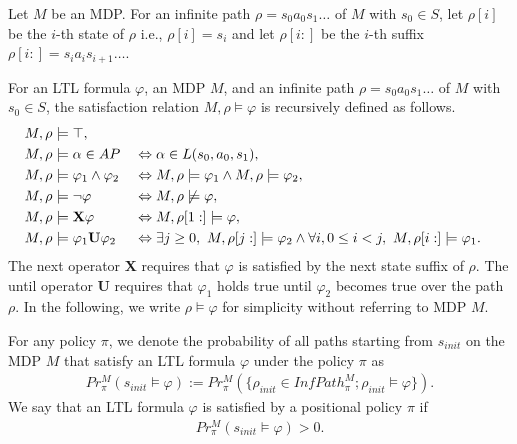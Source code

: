 \documentclass[a4j,12pt,oneside,openany,english]{jsbook}
\begin{document}
Let $ M $ be an MDP.
For an infinite path $\rho = s_0a_0s_1 \ldots $ of $ M $ with $ s_0 \in S $, let $\rho[i]$ be the $i$-th state of $\rho$ i.e., $\rho[i]=s_i$ and let $\rho[i:]$ be the $i$-th suffix $\rho[i:]=s_ia_is_{i+1} \ldots $.
\begin{definition}
	For an LTL formula $\varphi$, an MDP $M$, and an infinite path $\rho = s_0a_0s_1 \ldots$ of $ M $ with $ s_0 \in S $, the satisfaction relation $M,\rho \models \varphi$ is recursively defined as follows.
	\begin{alignat}{2}
	& M, \rho \models \top,\nonumber \\
	& M, \rho \models \alpha \in AP &&\Leftrightarrow \alpha \in L(s_0,a_0,s_1),\nonumber \\
	& M, \rho \models \varphi_1 \land \varphi_2 &&\Leftrightarrow M, \rho \models \varphi_1 \land M, \rho \models \varphi_2,\nonumber \\
	& M, \rho \models \neg \varphi &&\Leftrightarrow M, \rho \not\models \varphi,\nonumber \\
	& M, \rho \models \text{{\bf X}}\varphi &&\Leftrightarrow M, \rho[1:] \models \varphi,\nonumber \\
	& M, \rho \models \varphi_1 \text{{\bf U}} \varphi_2 &&\Leftrightarrow \exists j \geq 0, \ M, \rho[j:] \models \varphi_2 \land \forall i, 0\leq i < j, \ M, \rho[i:] \models \varphi_1.\nonumber
	\end{alignat}
The next operator {\bf X} requires that $\varphi$ is satisfied by the next state suffix of $\rho$. The until operator {\bf U} requires that $\varphi_1$ holds true until $\varphi_2$ becomes true over the path $\rho$.
In the following, we write $ \rho \models \varphi $ for simplicity without referring to MDP $ M $.


For any policy $\pi$, we denote the probability of all paths starting from $s_{init}$ on the MDP $M$ that satisfy an LTL formula $\varphi$ under the policy $\pi$ as
\begin{align*}
Pr^{M}_{\pi}(s_{init} \! \models \varphi) := Pr^{M}_{\pi}(\{ \rho_{init} \! \in \! InfPath^{M}_{\pi} ; \rho_{init} \! \models \varphi \}).
\end{align*}
We say that an LTL formula $\varphi$ is satisfied by a positional policy $\pi$ if
\begin{align*}
Pr^{M}_{\pi}(s_{init} \models \varphi) > 0.
\end{align*}



\label{def5}
\end{definition}
\end{document}
